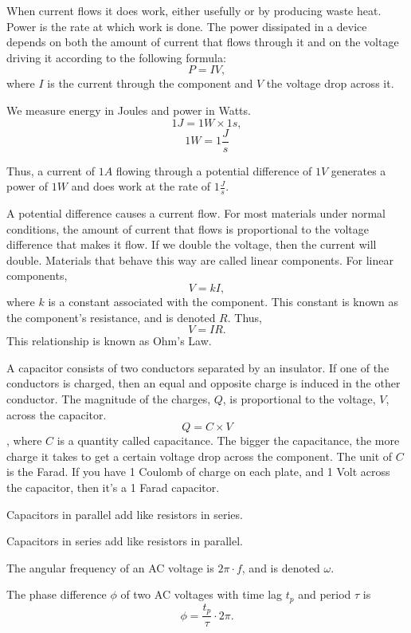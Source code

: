 \documentclass{article}
\begin{document}
    When current flows it does work, either usefully or by producing waste heat. Power is the rate at which work is done. The power dissipated in a device depends on both the amount of current that flows through it and on the voltage driving it according to the following formula: $$P = IV,$$ where $I$ is the current through the component and $V$ the voltage drop across it.

    We measure energy in Joules and power in Watts. $$1J = 1W \times 1s,$$ $$1W=1\frac Js$$

    Thus, a current of $1A$ flowing through a potential difference of $1V$ generates a power of $1W$ and does work at the rate of $1\frac Js$.

\medskip
{}

    A potential difference causes a current flow. For most materials under normal conditions, the amount of current that flows is proportional to the voltage difference that makes it flow. If we double the voltage, then the current will double. Materials that behave this way are called linear components. For linear components, $$V=kI,$$ where $k$ is a constant associated with the component. This constant is known as the component's resistance, and is denoted $R$. Thus, $$V=IR.$$ This relationship is known as Ohm's Law.

\medskip
{}

    A capacitor consists of two conductors separated by an insulator. If one of the conductors is charged, then an equal and opposite charge is induced in the other conductor. The magnitude of the charges, $Q$, is proportional to the voltage, $V$, across the capacitor. $$Q = C \times V$$, where $C$ is a quantity called capacitance. The bigger the capacitance, the more charge it takes to get a certain voltage drop across the component. The unit of $C$ is the Farad. If you have 1 Coulomb of charge on each plate, and 1 Volt across the capacitor, then it's a 1 Farad capacitor.

    Capacitors in parallel add like resistors in series.

    Capacitors in series add like resistors in parallel.

\medskip
{}

    The angular frequency of an AC voltage is $2\pi \cdot f$, and is denoted $\omega$.

\medskip
{}

    The phase difference $\phi$ of two AC voltages with time lag $t_p$ and period $\tau$ is $$\phi = \frac{t_p}{\tau} \cdot 2\pi.$$
\end{document}
